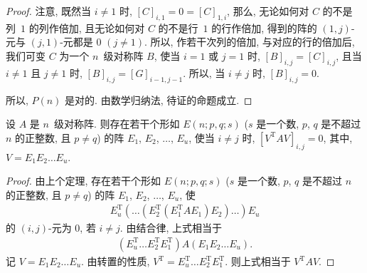 \documentclass[../libro.tex]{subfiles}
\begin{document}
\begin{proof}
    注意, 既然当 \(i \neq 1\) 时,
    \([C]_{i,1} = 0 = [C]_{1,i}\),
    那么,
    无论如何对 \(C\) 的不是列~\(1\) 的列作倍加,
    且无论如何对 \(C\) 的不是行~\(1\) 的行作倍加,
    得到的阵的 \((1, j)\)-元与 \((j, 1)\)-元都是 \(0\)
    \((j \neq 1)\).
    所以, 作若干次列的倍加, 与对应的行的倍加后,
    我们可变 \(C\) 为一个 \(n\)~级对称阵 \(B\),
    使当 \(i = 1\) 或 \(j = 1\) 时,
    \([B]_{i,j} = [C]_{i,j}\),
    且当 \(i \neq 1\) 且 \(j \neq 1\) 时,
    \([B]_{i,j} = [G]_{i-1,j-1}\).
    所以, 当 \(i \neq j\) 时, \([B]_{i,j} = 0\).

    所以, \(P(n)\) 是对的.
    由数学归纳法, 待证的命题成立.
\end{proof}

\begin{theorem}
    设 \(A\) 是 \(n\)~级对称阵.
    则存在若干个形如 \(E(n; p, q; s)\)
    (\(s\) 是一个数, %
    \(p\), \(q\) 是不超过 \(n\) 的正整数,
    且 \(p \neq q\)) %
    的阵
    \(E_1\), \(E_2\), \(\dots\), \(E_u\),
    使当 \(i \neq j\) 时,
    \([V^{\mathrm{T}} A V]_{i,j} = 0\),
    其中,
    \(V = E_1 E_2 \dots E_u\).
\end{theorem}

\begin{proof}
    由上个定理,
    存在若干个形如 \(E(n; p, q; s)\)
    (\(s\) 是一个数, %
    \(p\), \(q\) 是不超过 \(n\) 的正整数,
    且 \(p \neq q\)) %
    的阵
    \(E_1\), \(E_2\), \(\dots\), \(E_u\),
    使
    \begin{align*}
        E_u^{\mathrm{T}} (\dots (E_2^{\mathrm{T}} (E_1^{\mathrm{T}} A E_1) E_2) \dots) E_u
    \end{align*}
    的 \((i, j)\)-元为 \(0\), 若 \(i \neq j\).
    由结合律, 上式相当于
    \begin{align*}
        (E_u^{\mathrm{T}} \dots E_2^{\mathrm{T}} E_1^{\mathrm{T}}) A (E_1 E_2 \dots E_u).
    \end{align*}
    记 \(V = E_1 E_2 \dots E_u\).
    由转置的性质,
    \(V^{\mathrm{T}} = E_u^{\mathrm{T}} \dots E_2^{\mathrm{T}} E_1^{\mathrm{T}}\).
    则上式相当于 \(V^{\mathrm{T}} A V\).

\end{proof}
\end{document}
